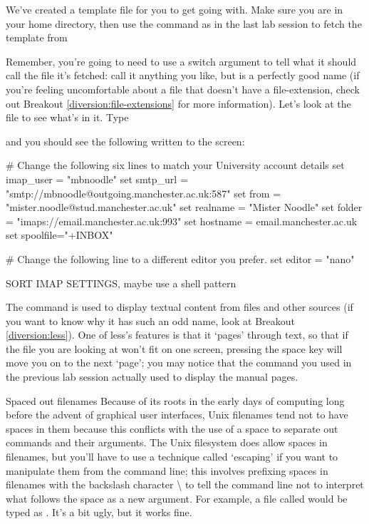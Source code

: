 We've created a template file for you to get going with. Make sure you are in your home directory, then use the  command as in the last lab session to fetch the template from  \\


Remember, you're going to need to use a switch argument to tell  what it should call the file it's fetched: call it anything you like, but  is a perfectly good name (if you're feeling uncomfortable about a file that doesn't have a file-extension, check out Breakout \ref{diversion:file-extensions} for more information). Let's look at the file to see what's in it. Type


and you should see the following written to the screen:
\begin{ttoutenv}
# Change the following six lines to match your University account details
set imap_user = "mbnoodle"
set smtp_url = "smtp://mbnoodle@outgoing.manchester.ac.uk:587"
set from = "mister.noodle@stud.manchester.ac.uk"
set realname = "Mister Noodle"
set folder = "imaps://email.manchester.ac.uk:993"
set hostname = email.manchester.ac.uk
set spoolfile="+INBOX"

# Change the following line to a different editor you prefer.
set editor = "nano"
\end{ttoutenv}

\begin{note}
SORT IMAP SETTINGS, maybe use a shell pattern
\end{note}

The  command is used to display textual content from files and other sources (if you want to know why it has such an odd name, look at Breakout \ref{diversion:less}). One of less's features is that it `pages' through text, so that if the file you are looking at won't fit on one screen, pressing the space key will move you on to the next `page'; you may notice that the  command you used in the previous lab session actually used  to display the manual pages.

\begin{linux}{Spaced out filenames}
Because of its roots in the early days of computing long before the advent of graphical user interfaces, Unix filenames tend not to have spaces in them because this conflicts with the use of a space to separate out commands and their arguments. The Unix filesystem does allow spaces in filenames, but you'll have to use a technique called `escaping' if you want to manipulate them from the command line; this involves prefixing spaces in filenames with the backslash character \textbackslash{} to tell the command line not to interpret what follows the space as a new argument. For example, a file called  would be typed as . It's a bit ugly, but it works fine. 
\end{linux} 

